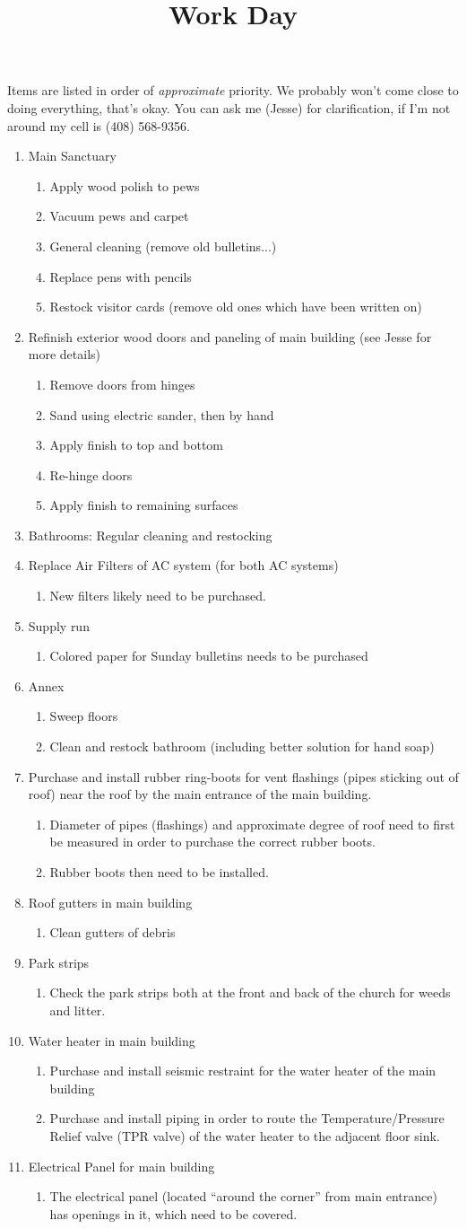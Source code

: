 \documentclass[12pt]{article}
\title{Work Day}
\newcommand{\BI}{\begin{enumerate}\item}
\newcommand{\I}{\item}
\newcommand{\EI}{\end{enumerate}}
\begin{document}
\maketitle
Items are listed in order of \emph{approximate} priority. 
We probably won't come close to doing everything, that's okay.
You can ask me (Jesse) for clarification, if I'm not around my cell is (408) 568-9356.
\BI Main Sanctuary
    \BI Apply wood polish to pews
    \I  Vacuum pews and carpet
    \I  General cleaning (remove old bulletins...)
    \I  Replace pens with pencils
    \I  Restock visitor cards (remove old ones which have been written on) \EI
\I  Refinish exterior wood doors and paneling of main building (see Jesse for more details)
    \BI Remove doors from hinges
    \I  Sand using electric sander, then by hand
    \I  Apply finish to top and bottom
    \I  Re-hinge doors
    \I  Apply finish to remaining surfaces \EI
\I  Bathrooms: Regular cleaning and restocking
\I  Replace Air Filters of AC system (for both AC systems)
    \BI New filters likely need to be purchased. \EI
\I  Supply run
    \BI Colored paper for Sunday bulletins needs to be purchased \EI
\I  Annex
    \BI Sweep floors
    \I  Clean and restock bathroom (including better solution for hand soap) \EI
\I  Purchase and install rubber ring-boots for vent flashings (pipes sticking out of roof) near the roof by the main entrance of the main building.
    \BI Diameter of pipes (flashings) and approximate degree of roof need to first be measured in order to purchase the correct rubber boots.
    \I  Rubber boots then need to be installed. \EI
\I  Roof gutters in main building
    \BI  Clean gutters of debris \EI
\I  Park strips
    \BI  Check the park strips both at the front and back of the church for weeds and litter. \EI
\I  Water heater in main building
    \BI Purchase and install seismic restraint for the water heater of the main building
    \I  Purchase and install piping in order to route the Temperature/Pressure Relief valve (TPR valve) of the water heater to the adjacent floor sink. \EI
\I  Electrical Panel for main building
    \BI  The electrical panel (located “around the corner” from main entrance) has openings in it, which need to be covered. \EI
\EI
\end{document}
